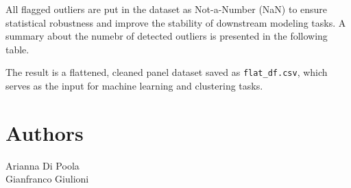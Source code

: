 \documentclass[11pt,a4paper]{article}
\begin{document}
All flagged outliers are put in the dataset as Not-a-Number (NaN) to ensure statistical robustness and improve the stability of downstream modeling tasks.
A summary about the numebr of detected outliers is presented in the following table.



The result is a flattened, cleaned panel dataset saved as \texttt{flat\_df.csv}, which serves as the input for machine learning and clustering tasks.

\section*{Authors}
Arianna Di Poola \\ Gianfranco Giulioni
\end{document}
